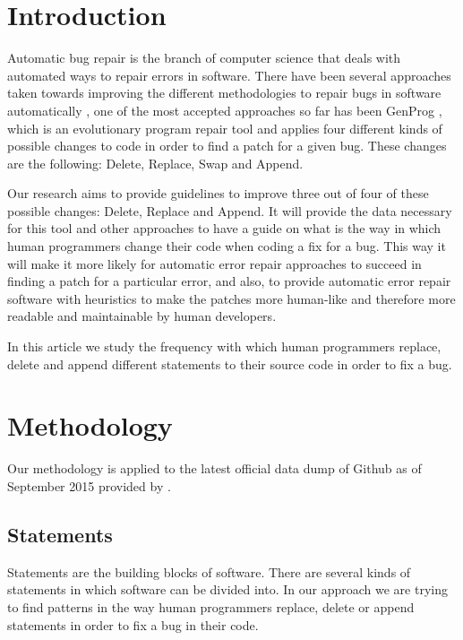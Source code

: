 \documentclass{sig-alternate-05-2015}
\begin{document}


\section{Introduction}
Automatic bug repair is the branch of computer science that deals with automated ways to repair errors in software. There have been several approaches taken towards improving the different methodologies to repair bugs in software automatically \cite{dongsun}\cite{weimer}\cite{claire} \cite{kai}, one of the most accepted approaches so far has been GenProg \cite{weimer}\cite{claire}, which is an evolutionary program repair tool and applies four different kinds of possible changes to code in order to find a patch for a given bug. These changes are the following: Delete, Replace, Swap and Append.

Our research aims to provide guidelines to improve three out of four of these possible changes: Delete, Replace and Append. It will provide the data necessary for this tool and other approaches to have a guide on what is the way in which human programmers change their code when coding a fix for a bug. This way it will make it more likely for automatic error repair approaches to succeed in finding a patch for a particular error, and also, to provide automatic error repair software with heuristics to make the patches more human-like and therefore more readable and maintainable by human developers.

In this article we study the frequency with which human programmers replace, delete and append different statements to their source code in order to fix a bug.


\section{Methodology}
Our methodology is applied to the latest official data dump of Github as of September 2015 provided by \cite{robert}.

\subsection{Statements}
Statements are the building blocks of software. There are several kinds of statements in which software can be divided into. In our approach we are trying to find patterns in the way human programmers replace, delete or append statements in order to fix a bug in their code.
\end{document}

